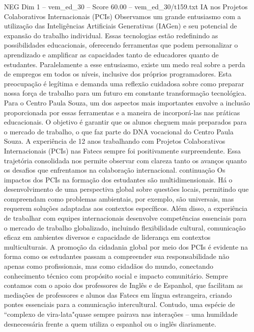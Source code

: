 \begin{textsample}{NEG Dim 1 – vem\_ed\_30 – Score 60.00 – vem\_ed\_30/t159.txt}  \label{ex:f1_neg_165}
IA nos Projetos Colaborativos Internacionais (PCIs) Observamos um grande entusiasmo com a utilização das Inteligências Artificiais Generativas (IAGen) e seu potencial de expansão do trabalho individual.
Essas tecnologias estão redefinindo as possibilidades educacionais, oferecendo ferramentas que podem personalizar o aprendizado e amplificar as capacidades tanto de educadores quanto de estudantes.
Paralelamente a esse entusiasmo, existe um medo real sobre a perda de empregos em todos os níveis, inclusive dos próprios programadores.
Esta preocupação é legítima e demanda uma reflexão cuidadosa sobre como preparar nossa força de trabalho para um futuro em constante transformação tecnológica.
Para o Centro Paula Souza, um dos aspectos mais importantes envolve a inclusão proporcionada por essas ferramentas e a maneira de incorporá-las nas práticas educacionais.
O objetivo é garantir que os alunos cheguem mais preparados para o mercado de trabalho, o que faz parte do DNA vocacional do Centro Paula Souza.
A experiência de 12 anos trabalhando com Projetos Colaborativos Internacionais (PCIs) nas Fatecs sempre foi positivamente surpreendente.
Essa trajetória consolidada nos permite observar com clareza tanto os avanços quanto os desafios que enfrentamos na colaboração internacional. continuação Os impactos dos PCIs na formação dos estudantes são multidimensionais.
Há o desenvolvimento de uma perspectiva global sobre questões locais, permitindo que compreendam como problemas ambientais, por exemplo, são universais, mas requerem soluções adaptadas aos contextos específicos.
Além disso, a experiência de trabalhar com equipes internacionais desenvolve competências essenciais para o mercado de trabalho globalizado, incluindo flexibilidade cultural, comunicação eficaz em ambientes diversos e capacidade de liderança em contextos multiculturais.
A promoção da cidadania global por meio dos PCIs é evidente na forma como os estudantes passam a compreender sua responsabilidade não apenas como profissionais, mas como cidadãos do mundo, conectando conhecimento técnico com propósito social e impacto comunitário.
Sempre contamos com o apoio dos professores de Inglês e de Espanhol, que facilitam as mediações de professores e alunos das Fatecs em língua estrangeira, criando pontes essenciais para a comunicação intercultural.
Contudo, uma espécie de “complexo de vira-lata"quase sempre pairava nas interações – uma humildade desnecessária frente a quem utiliza o espanhol ou o inglês diariamente.

\end{textsample}
